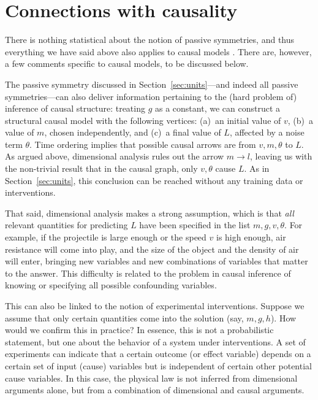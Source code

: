 \documentclass{article}
\theoremstyle{plain}
\theoremstyle{definition}
\theoremstyle{remark}
\begin{document}
\section{Connections with causality}\label{sec:causality}


There is nothing statistical about the notion of passive symmetries, and thus everything we have said above also applies to causal models \cite{PetJanSch17}. There are, however, a few comments specific to causal models, to be discussed below.

The passive symmetry discussed in Section~\ref{sec:units}---and indeed all passive symmetries---can also deliver information pertaining to the (hard problem of) inference of causal structure:
treating $g$ as a constant, we can construct a structural causal model with the following vertices: (a)~an initial value of $v$, (b)~a value of $m$, chosen independently, and (c)~a final value of $L$, affected by a noise term $\theta$.
Time ordering implies that possible causal arrows are from $v, m, \theta$ to $L$.
As argued above, dimensional analysis rules out the arrow $m\to l$, leaving us with the non-trivial result that in the causal graph, only $v,\theta$ cause $L$.
As in Section~\ref{sec:units}, this conclusion can be reached without any training data or interventions.

That said, dimensional analysis makes a strong assumption, which is that {\em all} relevant quantities for predicting $L$ have been specified in the list $m, g, v, \theta$.
For example, if the projectile is large enough or the speed $v$ is high enough, air resistance will come into play, and the size of the object and the density of air will enter, bringing new variables and new combinations of variables that matter to the answer.
This difficulty is related to the problem in causal inference of knowing or specifying all possible confounding variables.

This can also be linked to the notion of experimental interventions. Suppose we assume that only certain quantities come into the solution (say, $m, g, h$). How would we confirm this in practice? In essence, this is not a probabilistic statement, but one about the behavior of a system under interventions. A set of experiments can indicate that a certain outcome (or effect variable) depends on a certain set of input (cause) variables but is independent of certain other potential cause variables. In this case, the physical law is not inferred from dimensional arguments alone, but from a combination of dimensional and causal arguments.
\end{document}
